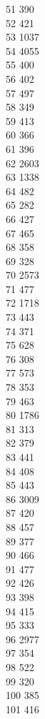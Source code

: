 { 51	390 \\
 52	421 \\
 53	1037 \\
 54	4055 \\
 55	400 \\
 56	402 \\
 57	497 \\
 58	349 \\
 59	413 \\
 60	366 \\
 61	396 \\
 62	2603 \\
 63	1338 \\
 64	482 \\
 65	282 \\
 66	427 \\
 67	465 \\
 68	358 \\
 69	328 \\
 70	2573 \\
 71	477 \\
 72	1718 \\
 73	443 \\
 74	371 \\
 75	628 \\
 76	308 \\
 77	573 \\
 78	353 \\
 79	463 \\
 80	1786 \\
 81	313 \\
 82	379 \\
 83	441 \\
 84	408 \\
 85	443 \\
 86	3009 \\
 87	420 \\
 88	457 \\
 89	377 \\
 90	466 \\
 91	477 \\
 92	426 \\
 93	398 \\
 94	415 \\
 95	333 \\
 96	2977 \\
 97	354 \\
 98	522 \\
 99	320 \\
 100	385 \\
 101	416 \\
}
